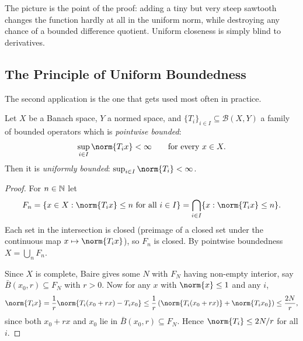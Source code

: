\documentclass[a4paper]{scrartcl}
\newcommand{\Bop}{\mathcal{B}}
\begin{document}
\begin{center}
\end{center}

The picture is the point of the proof: adding a tiny but very steep sawtooth changes the function hardly at all in the uniform norm, while destroying any chance of a bounded difference quotient. Uniform closeness is simply blind to derivatives.

\subsection{The Principle of Uniform Boundedness}

The second application is the one that gets used most often in practice.

\begin{theorem}
	Let $X$ be a Banach space, $Y$ a normed space, and $\{T_i\}_{i \in I} \subseteq \Bop(X,Y)$ a family of bounded operators which is \emph{pointwise bounded}:
	$$\sup_{i \in I} \norm{T_i x} < \infty \qquad \text{for every } x \in X.$$
	Then it is \emph{uniformly bounded}: $\sup_{i \in I} \norm{T_i} < \infty$.
\end{theorem}

\begin{proof}
	For $n \in \mathbb{N}$ let
	$$F_n = \{ x \in X : \norm{T_i x} \leq n \text{ for all } i \in I \} = \bigcap_{i \in I} \{x : \norm{T_ix} \leq n\}.$$
	Each set in the intersection is closed (preimage of a closed set under the continuous map $x \mapsto \norm{T_i x}$), so $F_n$ is closed. By pointwise boundedness $X = \bigcup_n F_n$.

	Since $X$ is complete, Baire gives some $N$ with $F_N$ having non-empty interior, say $\bar B(x_0, r) \subseteq F_N$ with $r > 0$. Now for any $x$ with $\norm{x} \leq 1$ and any $i$,
	$$\norm{T_i x} = \frac{1}{r}\norm{T_i (x_0 + rx) - T_i x_0} \leq \frac{1}{r}\left( \norm{T_i(x_0+rx)} + \norm{T_ix_0} \right) \leq \frac{2N}{r},$$
	since both $x_0 + rx$ and $x_0$ lie in $\bar B(x_0,r) \subseteq F_N$. Hence $\norm{T_i} \leq 2N/r$ for all $i$.
\end{proof}
\end{document}
